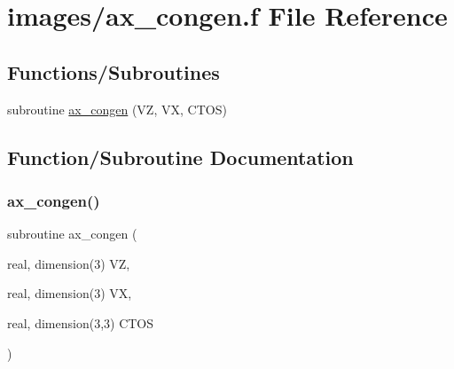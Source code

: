 \hypertarget{ax__congen_8f}{}\section{images/ax\+\_\+congen.f File Reference}
\label{ax__congen_8f}
\subsection*{Functions/\+Subroutines}
\begin{DoxyCompactItemize}
\item 
subroutine \hyperlink{ax__congen_8f_a953ced2daf15e90f3c1b66f0251d015a}{ax\+\_\+congen} (VZ, VX, C\+T\+OS)
\end{DoxyCompactItemize}


\subsection{Function/\+Subroutine Documentation}
\mbox{\label{ax__congen_8f_a953ced2daf15e90f3c1b66f0251d015a}} 
\subsubsection{\texorpdfstring{ax\+\_\+congen()}{ax\_congen()}}
{\footnotesize\ttfamily subroutine ax\+\_\+congen (\begin{DoxyParamCaption}\item[{real, dimension(3)}]{VZ,  }\item[{real, dimension(3)}]{VX,  }\item[{real, dimension(3,3)}]{C\+T\+OS }\end{DoxyParamCaption})}

